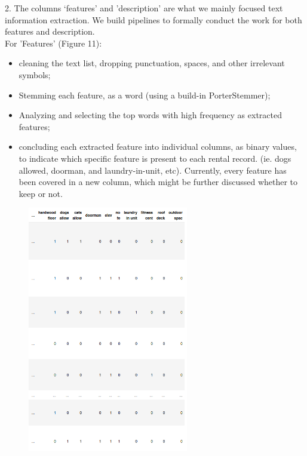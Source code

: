 \documentclass[10pt,twocolumn,letterpaper]{article}
\begin{document}
\begin{figure}[h!]%
    \centering
    \qquad
    \caption{}%
    \label{fig:example}%
\end{figure}


2. The columns ‘features’ and 'description' are what we mainly focused text information extraction. We build pipelines to formally conduct the work for both features and description. 
\\ For 'Features' (Figure 11):
\begin{itemize}
  \item cleaning the text list, dropping punctuation, spaces, and other irrelevant symbols;
  \item Stemming each feature, as a word (using a build-in PorterStemmer);
  \item Analyzing and selecting the top words with high frequency as extracted features;
  \item concluding each extracted feature into individual columns, as binary values, to indicate which specific feature is present to each rental record. (ie. dogs allowed, doorman, and laundry-in-unit, etc). Currently, every feature has been covered in a new column, which might be further discussed whether to keep or not.
\end{itemize}

\begin{figure}[h!]
    \centering
    \includegraphics[width=7cm]{featureMarix.png}
    \caption{}
    \label{fig:galaxy}
\end{figure}
\end{document}
